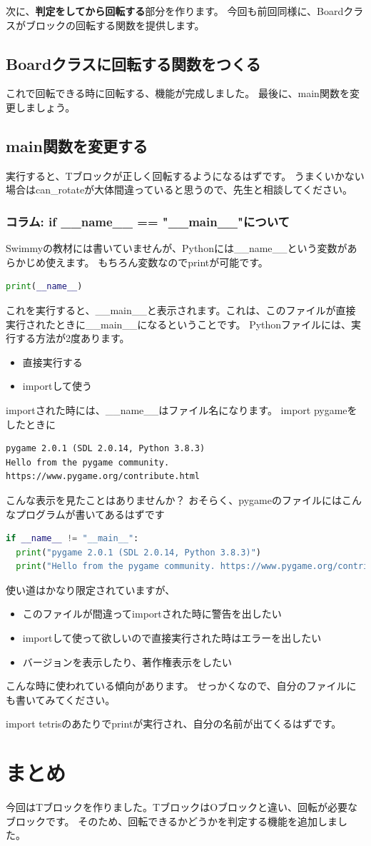 次に、\textbf{判定をしてから回転する}部分を作ります。
今回も前回同様に、Boardクラスがブロックの回転する関数を提供します。
\subsection{Boardクラスに回転する関数をつくる}

これで回転できる時に回転する、機能が完成しました。
最後に、main関数を変更しましょう。
\subsection{main関数を変更する}

実行すると、Tブロックが正しく回転するようになるはずです。
うまくいかない場合はcan\_rotateが大体間違っていると思うので、先生と相談してください。

\subsubsection{コラム: if \_\_name\_\_ == "\_\_main\_\_"について}
Swimmyの教材には書いていませんが、Pythonには\_\_name\_\_という変数があらかじめ使えます。
もちろん変数なのでprintが可能です。
\begin{lstlisting}[caption=\_\_name\_\_の使い方,language=Python]
print(__name__)
\end{lstlisting}
これを実行すると、\_\_main\_\_と表示されます。これは、このファイルが直接実行されたときに\_\_main\_\_になるということです。
Pythonファイルには、実行する方法が2度あります。
\begin{itemize}
  \item 直接実行する
  \item importして使う
\end{itemize}
importされた時には、\_\_name\_\_はファイル名になります。
import pygameをしたときに
\begin{verbatim}
pygame 2.0.1 (SDL 2.0.14, Python 3.8.3)
Hello from the pygame community. https://www.pygame.org/contribute.html
\end{verbatim}
こんな表示を見たことはありませんか？
おそらく、pygameのファイルにはこんなプログラムが書いてあるはずです
\begin{lstlisting}[caption=pygameのファイルの一部,language=Python]
if __name__ != "__main__":
  print("pygame 2.0.1 (SDL 2.0.14, Python 3.8.3)")
  print("Hello from the pygame community. https://www.pygame.org/contribute.html")
\end{lstlisting}
使い道はかなり限定されていますが、
\begin{itemize}
  \item このファイルが間違ってimportされた時に警告を出したい
  \item importして使って欲しいので直接実行された時はエラーを出したい
  \item バージョンを表示したり、著作権表示をしたい
\end{itemize}
こんな時に使われている傾向があります。
せっかくなので、自分のファイルにも書いてみてください。

import tetrisのあたりでprintが実行され、自分の名前が出てくるはずです。

\section{まとめ}
今回はTブロックを作りました。TブロックはOブロックと違い、回転が必要なブロックです。
そのため、回転できるかどうかを判定する機能を追加しました。